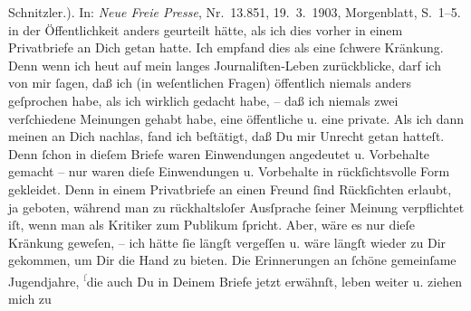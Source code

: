 \begin{ledgroupsized}[t]{13cm}
{{{{                        Schnitzler.)}. In: \emph{Neue Freie
                        Presse}, Nr. 13.851, 19. 3. 1903,
                     Morgenblatt, S. 1–5.}}}\label{K_L03478-4h} in der Öffentlichkeit anders geurteilt hätte, als ich dies vorher
               in einem Privatbriefe an Dich getan hatte. Ich empfand dies als eine ſchwere
               Kränkung. Denn wenn ich heut auf mein langes Journaliſten-Leben zurückblicke, darf
               ich von mir ſagen, daß ich (in weſentlichen Fragen) öffentlich niemals anders
               geſprochen habe, als ich wirklich gedacht habe, – daß ich niemals zwei verſchiedene
               Meinungen gehabt habe, eine öffentliche {\pb}u. eine
               private. Als ich dann meinen \label{K_L03478-5v}\label{K_L03478-5h} an Dich nachlas, fand ich beſtätigt, daß Du mir Unrecht getan hatteſt. Denn
               ſchon in dieſem Briefe waren Einwendungen angedeutet u. Vorbehalte gemacht – nur
               waren dieſe Einwendungen u. Vorbehalte in rückſichtsvolle Form gekleidet. Denn in
               einem Privatbriefe an einen Freund ſind Rückſichten erlaubt, ja geboten, während man
               zu rückhaltsloſer Ausſprache ſeiner Meinung verpflichtet iſt, wenn man als Kritiker
               zum Publikum ſpricht.\pend
           \pstart
           Aber, wäre es nur {\pb}dieſe Kränkung geweſen, – ich
               hätte ſie längſt vergeſſen u. wäre längſt wieder zu Dir gekommen, um Dir die Hand zu
               bieten. Die Erinnerungen an ſchöne gemeinſame Jugendjahre, \substVorne{}\textsuperscript{\textcolor{gray}{ſ}}\substDazwischen{}d\substHinten{}ie auch Du in Deinem Briefe jetzt erwähnſt, leben weiter u. ziehen mich zu

\end{ledgroupsized}
